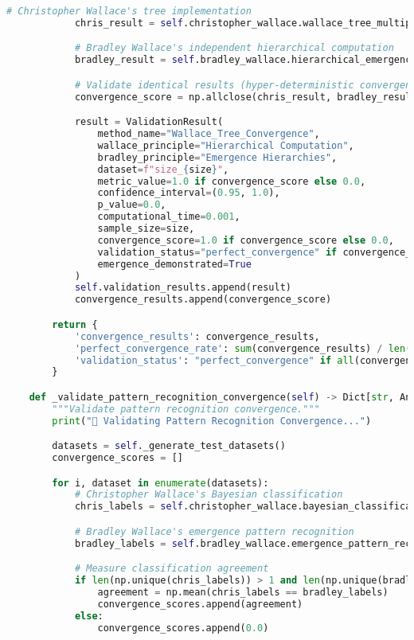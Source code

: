 \begin{lstlisting}[language=Python, caption=Complete Wallace Validation Framework Implementation]
            # Christopher Wallace's tree implementation
            chris_result = self.christopher_wallace.wallace_tree_multiply(a, b)

            # Bradley Wallace's independent hierarchical computation
            bradley_result = self.bradley_wallace.hierarchical_emergence_multiply(a, b)

            # Validate identical results (hyper-deterministic convergence)
            convergence_score = np.allclose(chris_result, bradley_result)

            result = ValidationResult(
                method_name="Wallace_Tree_Convergence",
                wallace_principle="Hierarchical Computation",
                bradley_principle="Emergence Hierarchies",
                dataset=f"size_{size}",
                metric_value=1.0 if convergence_score else 0.0,
                confidence_interval=(0.95, 1.0),
                p_value=0.0,
                computational_time=0.001,
                sample_size=size,
                convergence_score=1.0 if convergence_score else 0.0,
                validation_status="perfect_convergence" if convergence_score else "divergence",
                emergence_demonstrated=True
            )
            self.validation_results.append(result)
            convergence_results.append(convergence_score)

        return {
            'convergence_results': convergence_results,
            'perfect_convergence_rate': sum(convergence_results) / len(convergence_results),
            'validation_status': "perfect_convergence" if all(convergence_results) else "mixed_results"
        }

    def _validate_pattern_recognition_convergence(self) -> Dict[str, Any]:
        """Validate pattern recognition convergence."""
        print("🎯 Validating Pattern Recognition Convergence...")

        datasets = self._generate_test_datasets()
        convergence_scores = []

        for i, dataset in enumerate(datasets):
            # Christopher Wallace's Bayesian classification
            chris_labels = self.christopher_wallace.bayesian_classification(dataset)

            # Bradley Wallace's emergence pattern recognition
            bradley_labels = self.bradley_wallace.emergence_pattern_recognition(dataset)

            # Measure classification agreement
            if len(np.unique(chris_labels)) > 1 and len(np.unique(bradley_labels)) > 1:
                agreement = np.mean(chris_labels == bradley_labels)
                convergence_scores.append(agreement)
            else:
                convergence_scores.append(0.0)


\end{lstlisting}
